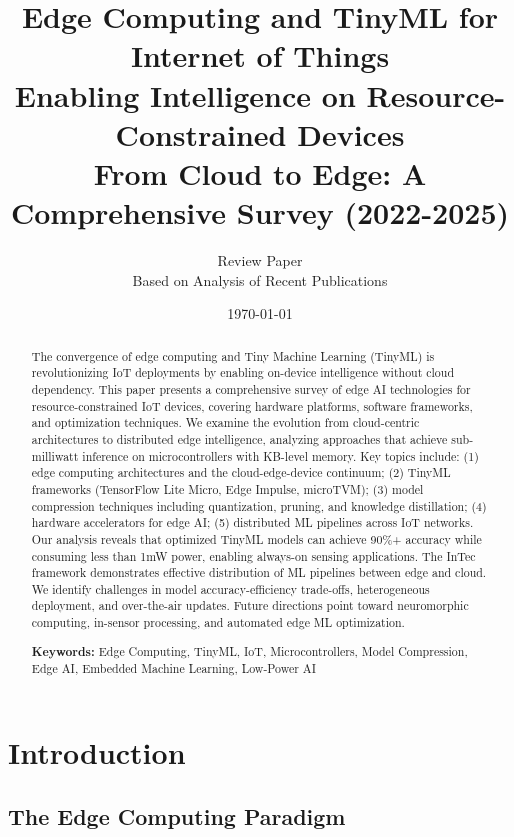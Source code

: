 \documentclass[12pt,a4paper]{article}
\title{
\vspace{-1cm}
{\Huge\bfseries Edge Computing and TinyML for Internet of Things}\\[0.5cm]
{\Large Enabling Intelligence on Resource-Constrained Devices}\\[0.3cm]
{\large From Cloud to Edge: A Comprehensive Survey (2022-2025)}
}
\author{
\large Review Paper\\[0.2cm]
\normalsize Based on Analysis of Recent Publications
}
\date{\today}
\begin{document}
\maketitle
\thispagestyle{empty}

\begin{abstract}
\noindent
The convergence of edge computing and Tiny Machine Learning (TinyML) is revolutionizing IoT deployments by enabling on-device intelligence without cloud dependency. This paper presents a comprehensive survey of edge AI technologies for resource-constrained IoT devices, covering hardware platforms, software frameworks, and optimization techniques. We examine the evolution from cloud-centric architectures to distributed edge intelligence, analyzing approaches that achieve sub-milliwatt inference on microcontrollers with KB-level memory. Key topics include: (1) edge computing architectures and the cloud-edge-device continuum; (2) TinyML frameworks (TensorFlow Lite Micro, Edge Impulse, microTVM); (3) model compression techniques including quantization, pruning, and knowledge distillation; (4) hardware accelerators for edge AI; (5) distributed ML pipelines across IoT networks. Our analysis reveals that optimized TinyML models can achieve 90\%+ accuracy while consuming less than 1mW power, enabling always-on sensing applications. The InTec framework demonstrates effective distribution of ML pipelines between edge and cloud. We identify challenges in model accuracy-efficiency trade-offs, heterogeneous deployment, and over-the-air updates. Future directions point toward neuromorphic computing, in-sensor processing, and automated edge ML optimization.

\vspace{0.3cm}
\noindent\textbf{Keywords:} Edge Computing, TinyML, IoT, Microcontrollers, Model Compression, Edge AI, Embedded Machine Learning, Low-Power AI
\end{abstract}

\newpage
\tableofcontents
\newpage

\section{Introduction}

\subsection{The Edge Computing Paradigm}
\end{document}
